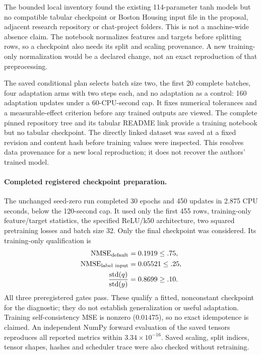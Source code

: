\documentclass[11pt,a4paper]{article}
\begin{document}
The bounded local inventory found the existing 114-parameter tanh models
but no compatible tabular checkpoint or Boston Housing input file in the
proposal, adjacent research repository or chat-project folders. This is
not a machine-wide absence claim. The notebook normalizes features and
targets before splitting rows, so a checkpoint also needs its split and
scaling provenance. A new training-only normalization would be a declared
change, not an exact reproduction of that preprocessing.

The saved conditional plan selects batch size two, the first 20 complete
batches, four adaptation arms with two steps each, and no adaptation as a
control: 160 adaptation updates under a 60-CPU-second cap. It fixes numerical
tolerances and a measurable-effect criterion before any trained outputs
are viewed. The complete pinned repository tree and its tabular README
link provide a training notebook but no tabular checkpoint. The directly
linked dataset was saved at a fixed revision and content hash before
training values were inspected. This resolves data provenance for a new local
reproduction; it does not recover the authors' trained model.

\paragraph{Completed registered checkpoint preparation.}
The unchanged seed-zero run completed 30 epochs and 450 updates in
2.875 CPU seconds, below the 120-second cap. It used only the first 455
rows, training-only feature/target statistics, the specified ReLU/k50
architecture, two squared pretraining losses and batch size 32. Only
the final checkpoint was considered. Its training-only qualification is
\begin{align*}
 \mathrm{NMSE}_{\rm default}&=0.1919\le .75,\\
 \mathrm{NMSE}_{\rm label\ input}&=0.05521\le .25,\\
 \frac{\operatorname{std}(q)}{\operatorname{std}(y)}&=0.8699\ge .10.
\end{align*}
All three preregistered gates pass. These qualify a fitted, nonconstant
checkpoint for the diagnostic; they do not establish generalization or
useful adaptation. Training self-consistency MSE is nonzero ($0.01475$),
so no exact idempotence is claimed. An independent NumPy forward evaluation
of the saved tensors reproduces all reported metrics within $3.34\times10^{-16}$.
Saved scaling, split indices, tensor shapes, hashes and scheduler trace
were also checked without retraining.
\end{document}
